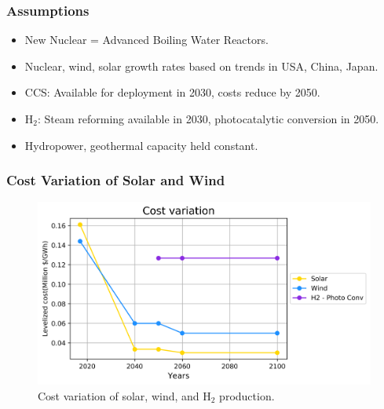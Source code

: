 \begin{frame}
  \frametitle{Assumptions}

  \begin{itemize}
  
  \item New Nuclear = Advanced Boiling Water Reactors.
  
  \item Nuclear, wind, solar growth rates based on trends in USA, China, Japan.
  
  \item CCS: Available for deployment in 2030, costs reduce by 2050.
  
  \item H$_2$: Steam reforming available in 2030, photocatalytic conversion in 2050.
  
  \item Hydropower, geothermal capacity held constant.
  
  \end{itemize}

\end{frame}


\begin{frame}
  \frametitle{Cost Variation of Solar and Wind}
  \begin{figure}[htbp!]
    \begin{center}
      \includegraphics[scale=0.6]{./images/cost}
    \end{center}
          \caption{Cost variation of solar, wind, and H$_2$ production.}
    \label{cost}
  \end{figure}
\end{frame}
